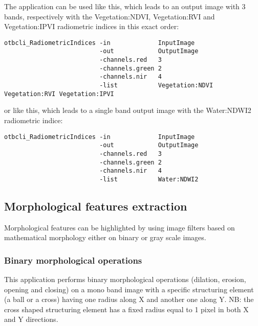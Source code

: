 The application can be used like this, which leads to an output image with 3 bands,
respectively with the Vegetation:NDVI, Vegetation:RVI and Vegetation:IPVI
radiometric indices in this exact order:

\begin{verbatim}
otbcli_RadiometricIndices -in             InputImage
                          -out            OutputImage
                          -channels.red   3
                          -channels.green 2
                          -channels.nir   4
                          -list           Vegetation:NDVI Vegetation:RVI Vegetation:IPVI 
\end{verbatim}


or like this, which leads to a single band output image with the Water:NDWI2 radiometric indice:
\begin{verbatim}
otbcli_RadiometricIndices -in             InputImage
                          -out            OutputImage
                          -channels.red   3
                          -channels.green 2
                          -channels.nir   4
                          -list           Water:NDWI2 
\end{verbatim}

        




\subsection{Morphological features extraction}\label{ssec:morphofeatextraction}

Morphological features can be highlighted by using image filters based on
mathematical morphology either on binary or gray scale images.

\subsubsection{Binary morphological operations}

This application performs binary morphological operations (dilation, erosion,
opening and closing) on a mono band image with a specific structuring element (a
ball or a cross) having one radius along X and another one along Y. NB: the cross
shaped structuring element has a fixed radius equal to 1 pixel in both X and Y
directions.

